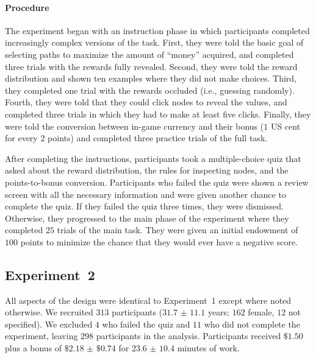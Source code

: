 \paragraph{Procedure}
The experiment began with an instruction phase in which participants completed increasingly complex versions of the task. First, they were told the basic goal of selecting paths to maximize the amount of ``money'' acquired, and completed three trials with the rewards fully revealed. Second, they were told the reward distribution and shown ten examples where they did not make choices. Third, they completed one trial with the rewards occluded (i.e., guessing randomly). Fourth, they were told that they could click nodes to reveal the values, and completed three trials in which they had to make at least five clicks. Finally, they were told the conversion between in-game currency and their bonus ($1$ US cent for every $2$ points) and completed three practice trials of the full task.

After completing the instructions, participants took a multiple-choice quiz that asked about the reward distribution, the rules for inspecting nodes, and the points-to-bonus conversion. Participants who failed the quiz were shown a review screen with all the necessary information and were given another chance to complete the quiz. If they failed the quiz three times, they were dismissed. Otherwise, they progressed to the main phase of the experiment where they completed $25$ trials of the main task. They were given an initial endowment of $100$ points to minimize the chance that they would ever have a negative score.

\subsection{Experiment~2}\label{sec:planning-methods2}
All aspects of the design were identical to Experiment~1 except where noted otherwise. We recruited $313$ participants ($31.7$ $\pm$ $11.1$ years; $162$ female, $12$ not specified). We excluded $4$ who failed the quiz and $11$ who did not complete the experiment, leaving $298$ participants in the analysis. Participants received $\$1.50$ plus a bonus of $\$2.18$ $\pm$ $\$0.74$ for $23.6$ $\pm$ $10.4$ minutes of work.

